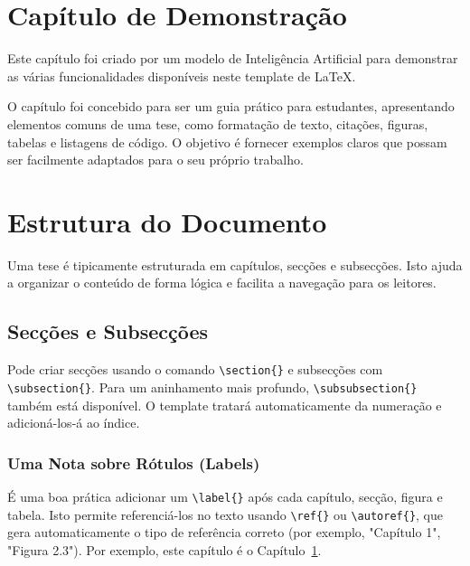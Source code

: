 \section{Capítulo de Demonstração}
\label{chap:demonstration}

\begin{introduction}
Este capítulo foi criado por um modelo de Inteligência Artificial para demonstrar as várias funcionalidades disponíveis neste template de \LaTeX{}. 
\end{introduction}

O capítulo foi concebido para ser um guia prático para estudantes, apresentando elementos comuns de uma tese, como formatação de texto, citações, figuras, tabelas e listagens de código. O objetivo é fornecer exemplos claros que possam ser facilmente adaptados para o seu próprio trabalho.

\section{Estrutura do Documento}
Uma tese é tipicamente estruturada em capítulos, secções e subsecções. Isto ajuda a organizar o conteúdo de forma lógica e facilita a navegação para os leitores.

\subsection{Secções e Subsecções}
Pode criar secções usando o comando \verb|\section{}| e subsecções com \verb|\subsection{}|. Para um aninhamento mais profundo, \verb|\subsubsection{}| também está disponível. O template tratará automaticamente da numeração e adicioná-los-á ao índice.

\subsubsection{Uma Nota sobre Rótulos (Labels)}
É uma boa prática adicionar um \verb|\label{}| após cada capítulo, secção, figura e tabela. Isto permite referenciá-los no texto usando \verb|\ref{}| ou \verb|\autoref{}|, que gera automaticamente o tipo de referência correto (por exemplo, "Capítulo 1", "Figura 2.3"). Por exemplo, este capítulo é o Capítulo~\ref{chap:demonstration}.

